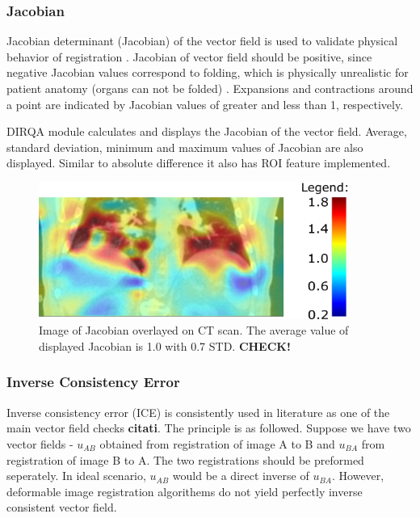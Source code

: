 \documentclass[type=dr, dr=rernat, accentcolor=tud7b,colorbacktitle, bigchapter, openright, twoside, 12pt ]{tudthesis}
\begin{document}
\subsubsection{Jacobian}
\label{Jacobian}

Jacobian determinant (Jacobian) of the vector field is used to validate physical behavior of registration \cite{Leow2007}. Jacobian of vector field should be positive, since negative Jacobian values correspond to folding, which is physically unrealistic for patient anatomy (organs can not be folded) \cite{Chen2008, Rey2002}. Expansions and contractions around a point are indicated by Jacobian values of greater and less than 1, respectively. 

DIRQA module calculates and displays the Jacobian of the vector field. Average, standard deviation, minimum and maximum values of Jacobian are also displayed. Similar to absolute difference it also has ROI feature implemented.

\begin{figure}[H]
	\begin{center}		
		\includegraphics[width=0.9\textwidth]{./Images/jacobian.png}
		\caption{Image of Jacobian overlayed on CT scan. The average value of displayed Jacobian is 1.0 with 0.7 STD. \textbf{CHECK!}}
		\label{Jacobian}
	\end{center}
\end{figure}

\subsubsection{Inverse Consistency Error}
\label{ICE}

Inverse consistency error (ICE) is consistently used in literature as one of the main vector field checks \textbf{citati}. The principle is as followed. Suppose we have two vector fields - $u_{AB}$ obtained from registration of image A to B and $u_{BA}$ from registration of image B to A. The two registrations
should be preformed seperately. In ideal scenario, $u_{AB}$ would be a direct inverse of $u_{BA}$. However, deformable image registration algorithems do not yield perfectly inverse consistent vector field.
\end{document}
